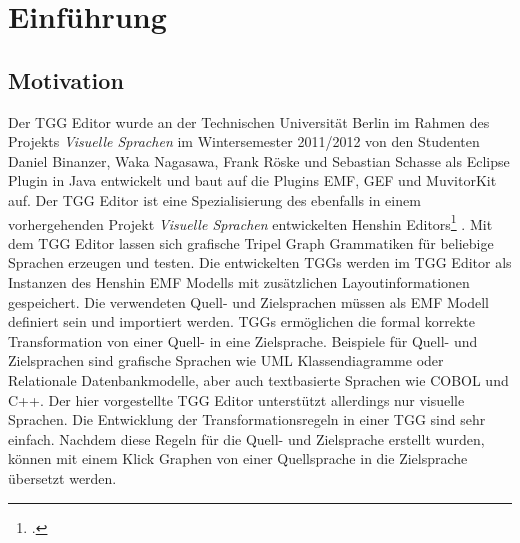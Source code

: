 \chapter{Einführung}

\section{Motivation}
Der TGG Editor wurde an der Technischen Universität Berlin im Rahmen des Projekts \emph{Visuelle Sprachen} im Wintersemester 2011/2012 von den Studenten Daniel Binanzer, Waka Nagasawa, Frank Röske und Sebastian Schasse als Eclipse Plugin in Java entwickelt und baut auf die Plugins EMF, GEF und MuvitorKit auf. Der TGG Editor ist eine Spezialisierung des ebenfalls in einem vorhergehenden Projekt \emph{Visuelle Sprachen} entwickelten Henshin Editors\footcite[][\url{http://tfs.cs.tu-berlin.de/henshin/}]{henshinwebsite}
. Mit dem TGG Editor lassen sich grafische Tripel Graph Grammatiken für beliebige Sprachen erzeugen und testen. Die entwickelten TGGs werden im TGG Editor als Instanzen des Henshin EMF Modells mit zusätzlichen Layoutinformationen gespeichert. Die verwendeten Quell- und Zielsprachen müssen als EMF Modell definiert sein und importiert werden. TGGs ermöglichen die formal korrekte Transformation von einer Quell- in eine Zielsprache. Beispiele für Quell- und Zielsprachen sind grafische Sprachen wie UML Klassendiagramme oder Relationale Datenbankmodelle, aber auch textbasierte Sprachen wie COBOL und C++. Der hier vorgestellte TGG Editor unterstützt allerdings nur visuelle Sprachen. Die Entwicklung der Transformationsregeln in einer TGG sind sehr einfach. Nachdem diese Regeln für die Quell- und Zielsprache erstellt wurden, können mit einem Klick Graphen von einer Quellsprache in die Zielsprache übersetzt werden.


%
%

